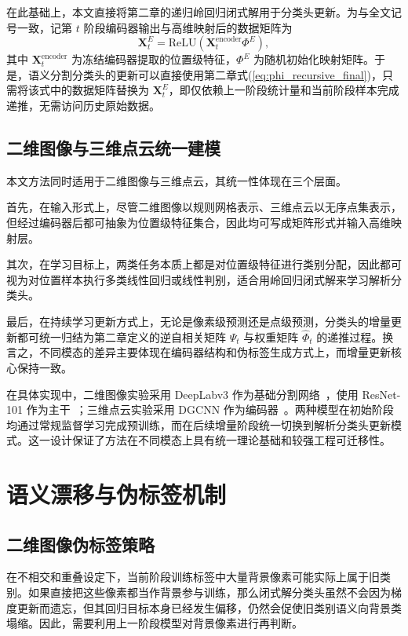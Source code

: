 在此基础上，本文直接将第二章的递归岭回归闭式解用于分类头更新。为与全文记号一致，记第 $t$ 阶段编码器输出与高维映射后的数据矩阵为
\begin{equation}
\mathbf{X}_t^{E} = \mathrm{ReLU}(\mathbf{X}_t^{\mathrm{encoder}}\Phi^E),
\label{eq:cfsseg_e}
\end{equation}
其中 $\mathbf{X}_t^{\mathrm{encoder}}$ 为冻结编码器提取的位置级特征，$\Phi^E$ 为随机初始化映射矩阵。于是，语义分割分类头的更新可以直接使用第二章式(\ref{eq:phi_recursive_final})，只需将该式中的数据矩阵替换为 $\mathbf{X}_t^{E}$，即仅依赖上一阶段统计量和当前阶段样本完成递推，无需访问历史原始数据。

\subsection{二维图像与三维点云统一建模}

本文方法同时适用于二维图像与三维点云，其统一性体现在三个层面。

首先，在输入形式上，尽管二维图像以规则网格表示、三维点云以无序点集表示，但经过编码器后都可抽象为位置级特征集合，因此均可写成矩阵形式并输入高维映射层。

其次，在学习目标上，两类任务本质上都是对位置级特征进行类别分配，因此都可视为对位置样本执行多类线性回归或线性判别，适合用岭回归闭式解来学习解析分类头。

最后，在持续学习更新方式上，无论是像素级预测还是点级预测，分类头的增量更新都可统一归结为第二章定义的逆自相关矩阵 $\Psi_t$ 与权重矩阵 $\widehat{\Phi}_t$ 的递推过程。换言之，不同模态的差异主要体现在编码器结构和伪标签生成方式上，而增量更新核心保持一致。

在具体实现中，二维图像实验采用 DeepLabv3 作为基础分割网络~\citep{chen2017deeplabv3}，使用 ResNet-101 作为主干~\citep{he2016resnet}；三维点云实验采用 DGCNN 作为编码器~\citep{wang2019dgcnn}。两种模型在初始阶段均通过常规监督学习完成预训练，而在后续增量阶段统一切换到解析分类头更新模式。这一设计保证了方法在不同模态上具有统一理论基础和较强工程可迁移性。

\section{语义漂移与伪标签机制}

\subsection{二维图像伪标签策略}

在不相交和重叠设定下，当前阶段训练标签中大量背景像素可能实际上属于旧类别。如果直接把这些像素都当作背景参与训练，那么闭式解分类头虽然不会因为梯度更新而遗忘，但其回归目标本身已经发生偏移，仍然会促使旧类别语义向背景类塌缩。因此，需要利用上一阶段模型对背景像素进行再判断。

